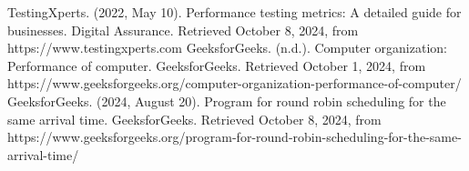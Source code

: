 \documentclass[12pt]{article}
\begin{document}
\begin{thebibliography}{9}
    TestingXperts. (2022, May 10). Performance testing metrics: A detailed guide for businesses. Digital Assurance. Retrieved October 8, 2024, from https://www.testingxperts.com
    GeeksforGeeks. (n.d.). Computer organization: Performance of computer. GeeksforGeeks. Retrieved October 1, 2024, from https://www.geeksforgeeks.org/computer-organization-performance-of-computer/
    GeeksforGeeks. (2024, August 20). Program for round robin scheduling for the same arrival time. GeeksforGeeks. Retrieved October 8, 2024, from https://www.geeksforgeeks.org/program-for-round-robin-scheduling-for-the-same-arrival-time/
\end{thebibliography}
\end{document}
